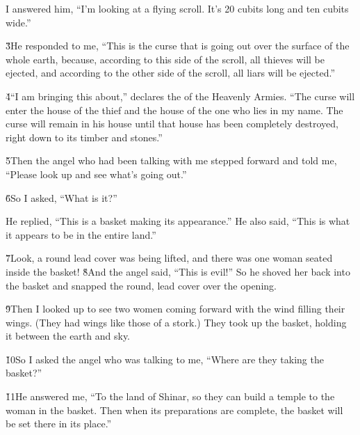 I answered him, ``I'm looking at a flying scroll. It's 20 cubits long and ten cubits wide.''

\v{3}He responded to me, ``This is the curse that is going out over the surface of the whole earth, because, according to this side of the scroll, all thieves will be ejected, and according to the other side of the scroll, all liars will be ejected.''

\v{4}``I am bringing this about,'' declares the  of the Heavenly Armies. ``The curse will enter the house of the thief and the house of the one who lies in my name. The curse will remain in his house until that house has been completely destroyed, right down to its timber and stones.''

\v{5}Then the angel who had been talking with me stepped forward and told me, ``Please look up and see what's going out.''

\v{6}So I asked, ``What is it?''

He replied, ``This is a basket making its appearance.'' He also said, ``This is what it appears to be in the entire land.''

\v{7}Look, a round lead cover was being lifted, and there was one woman seated inside the basket! \v{8}And the angel said, ``This is evil!'' So he shoved her back into the basket and snapped the round, lead cover over the opening.

\v{9}Then I looked up to see two women coming forward with the wind filling their wings. (They had wings like those of a stork.) They took up the basket, holding it between the earth and sky.

\v{10}So I asked the angel who was talking to me, ``Where are they taking the basket?''

\v{11}He answered me, ``To the land of Shinar, so they can build a temple to the woman in the basket. Then when its preparations are complete, the basket will be set there in its place.''

